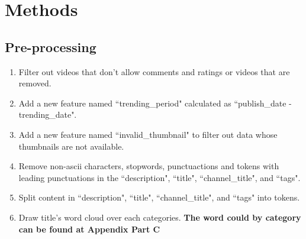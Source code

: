 \documentclass[english]{article}
\begin{document}
\section{Methods}
\begin{enumerate}
    
    \subsection{Pre-processing}
    \label{preprocess}
    \begin{enumerate}
    \item Filter out videos that don't allow comments and ratings or videos that are removed.
    \item Add a new feature named ``trending\_period" calculated as ``publish\_date - trending\_date".
    \item Add a new feature named ``invalid\_thumbnail" to filter out data whose thumbnails are not available.
    \item Remove non-ascii characters, stopwords, punctuactions and tokens with leading punctuations in the ``description", ``title", ``channel\_title", and ``tags".
    \item Split content in ``description", ``title", ``channel\_title", and ``tags" into tokens.
    \item Draw title's word cloud over each categories.
    \bf{The word could by category can be found at Appendix Part C}

    \end{enumerate}
    

\end{enumerate}
\end{document}
